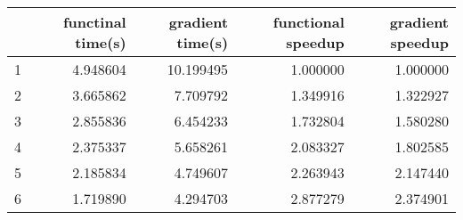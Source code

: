 \begin{tabular}{lrrrr}
\toprule
{} &  functinal time(s) &  gradient time(s) &  functional speedup &  gradient speedup \\
\midrule
1 &           4.948604 &         10.199495 &            1.000000 &          1.000000 \\
2 &           3.665862 &          7.709792 &            1.349916 &          1.322927 \\
3 &           2.855836 &          6.454233 &            1.732804 &          1.580280 \\
4 &           2.375337 &          5.658261 &            2.083327 &          1.802585 \\
5 &           2.185834 &          4.749607 &            2.263943 &          2.147440 \\
6 &           1.719890 &          4.294703 &            2.877279 &          2.374901 \\
\bottomrule
\end{tabular}
